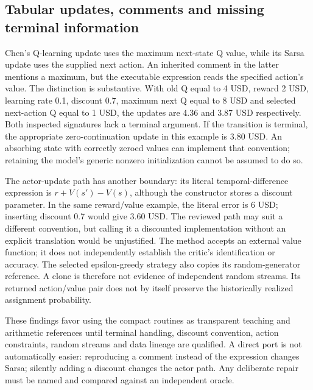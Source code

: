 \subsection{Tabular updates, comments and missing terminal information}
Chen's Q-learning update uses the maximum next-state Q value, while its Sarsa update uses the supplied next action. An inherited comment in the latter mentions a maximum, but the executable expression reads the specified action's value. The distinction is substantive. With old Q equal to 4 USD, reward 2 USD, learning rate 0.1, discount 0.7, maximum next Q equal to 8 USD and selected next-action Q equal to 1 USD, the updates are 4.36 and 3.87 USD respectively. Both inspected signatures lack a terminal argument. If the transition is terminal, the appropriate zero-continuation update in this example is 3.80 USD. An absorbing state with correctly zeroed values can implement that convention; retaining the model's generic nonzero initialization cannot be assumed to do so.~\citep{exec24_policyjava_chen,exec24_policyjava_comparison}

The actor-update path has another boundary: its literal temporal-difference expression is $r+V(s')-V(s)$, although the constructor stores a discount parameter. In the same reward/value example, the literal error is 6 USD; inserting discount 0.7 would give 3.60 USD. The reviewed path may suit a different convention, but calling it a discounted implementation without an explicit translation would be unjustified. The method accepts an external value function; it does not independently establish the critic's identification or accuracy. The selected epsilon-greedy strategy also copies its random-generator reference. A clone is therefore not evidence of independent random streams. Its returned action/value pair does not by itself preserve the historically realized assignment probability.~\citep{exec24_policyjava_chen,exec24_policyjava_comparison}

These findings favor using the compact routines as transparent teaching and arithmetic references until terminal handling, discount convention, action constraints, random streams and data lineage are qualified. A direct port is not automatically easier: reproducing a comment instead of the expression changes Sarsa; silently adding a discount changes the actor path. Any deliberate repair must be named and compared against an independent oracle.

